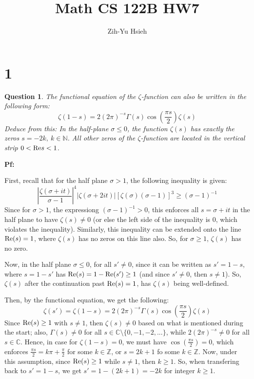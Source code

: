 \documentclass{article}
\title{Math CS 122B HW7}
\author{Zih-Yu Hsieh}
\newtheorem{question}{Question}
\begin{document}
\maketitle

\section*{1}
\begin{myBox}[]{}
    \begin{question}
        The functional equation of the $\zeta$-function can also be written in the following form:
        $$\zeta(1-s)=2(2\pi)^{-s}\Gamma(s)\cos\left(\frac{\pi s}{2}\right)\zeta(s)$$
        Deduce from this: In the half-plane $\sigma\leq 0$, the function $\zeta(s)$ has exactly the zeros $s=-2k,\ k\in\mathbb{N}$. All other zeros of the $\zeta$-function are located in the vertical strip $0<\textmd{Re} s<1$.
    \end{question}
\end{myBox}

\textbf{Pf:}

First, recall that for the half plane $\sigma>1$, the following inequality is given:
$$\left|\frac{\zeta(\sigma+it)}{\sigma-1}\right|^4|\zeta(\sigma+2it)|[\zeta(\sigma)(\sigma-1)]^3\geq (\sigma-1)^{-1}$$
Since for $\sigma>1$, the expressiong $(\sigma-1)^{-1}>0$, this enforces all $s = \sigma+it$ in the half plane to have $\zeta(s)\neq 0$ (or else the left side of the inequality is $0$, which violates the inequality). Similarly, this inequality can be extended onto the line $\textmd{Re}(s)=1$, where $\zeta(s)$ has no zeros on this line also. So, for $\sigma\geq 1$, $\zeta(s)$ has no zero.

\hfil

Now, in the half plane $\sigma\leq 0$, for all $s'\neq 0$, since it can be written as $s'=1-s$, where $s=1-s'$ has $\textmd{Re}(s)=1-\textmd{Re}(s') \geq 1$ (and since $s'\neq 0$, then $s\neq 1$). So, $\zeta(s)$ after the continuation past $\textmd{Re}(s)=1$, has $\zeta(s)$ being well-defined.

Then, by the functional equation, we get the following:
$$\zeta(s')=\zeta(1-s)=2(2\pi)^{-s}\Gamma(s)\cos\left(\frac{\pi s}{2}\right)\zeta(s)$$
Since $\textmd{Re}(s)\geq 1$ with $s\neq 1$, then $\zeta(s)\neq 0$ based on what is mentioned during the start; also, $\Gamma(s)\neq 0$ for all $s\in \mathbb{C}\setminus \{0,-1,-2,...\}$, while $2(2\pi)^{-s}\neq 0$ for all $s\in\mathbb{C}$. Hence, in case for $\zeta(1-s)=0$, we must have $\cos(\frac{\pi s}{2})=0$, which enforces $\frac{\pi s}{2} = k\pi + \frac{\pi}{2}$ for some $k\in\mathbb{Z}$, or $s = 2k+1$ fo some $k\in\mathbb{Z}$. Now, under this assumption, since $\textmd{Re}(s)\geq 1$ while $s\neq 1$, then $k\geq 1$. So, when transfering back to $s'=1-s$, we get $s' = 1-(2k+1)=-2k$ for integer $k\geq 1$.
\end{document}
